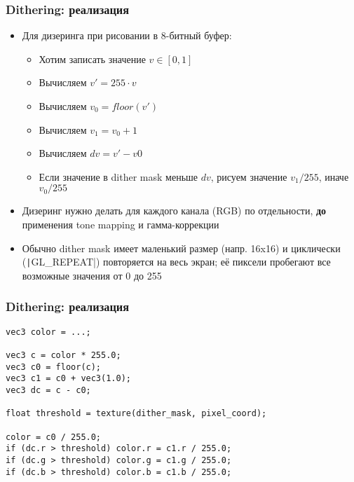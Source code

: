 \documentclass[10pt]{beamer}
\begin{document}
\begin{frame}[fragile]
\frametitle{Dithering: реализация}
\begin{itemize}
\item Для дизеринга при рисовании в 8-битный буфер:
\begin{itemize}
\item Хотим записать значение \begin{math}v \in [0, 1]\end{math}
\item Вычисляем \begin{math}v' = 255 \cdot v\end{math}
\item Вычисляем \begin{math}v_0 = floor(v')\end{math}
\item Вычисляем \begin{math}v_1 = v_0 + 1\end{math}
\item Вычисляем \begin{math}dv = v' - v0\end{math}
\item Если значение в dither mask меньше \begin{math}dv\end{math}, рисуем значение \begin{math}v_1 / 255\end{math}, иначе \begin{math}v_0 / 255\end{math}
\end{itemize}
\pause
\item Дизеринг нужно делать для каждого канала (RGB) по отдельности, \textbf{до} применения tone mapping и гамма-коррекции
\pause
\item Обычно dither mask имеет маленький размер (напр. 16x16) и циклически (\texttt|GL_REPEAT|) повторяется на весь экран; её пиксели пробегают все возможные значения от 0 до 255
\end{itemize}
\end{frame}

\begin{frame}[fragile]
\frametitle{Dithering: реализация}
\begin{verbatim}
vec3 color = ...;

vec3 c = color * 255.0;
vec3 c0 = floor(c);
vec3 c1 = c0 + vec3(1.0);
vec3 dc = c - c0;

float threshold = texture(dither_mask, pixel_coord);

color = c0 / 255.0;
if (dc.r > threshold) color.r = c1.r / 255.0;
if (dc.g > threshold) color.g = c1.g / 255.0;
if (dc.b > threshold) color.b = c1.b / 255.0;
\end{verbatim}
\end{frame}
\end{document}
